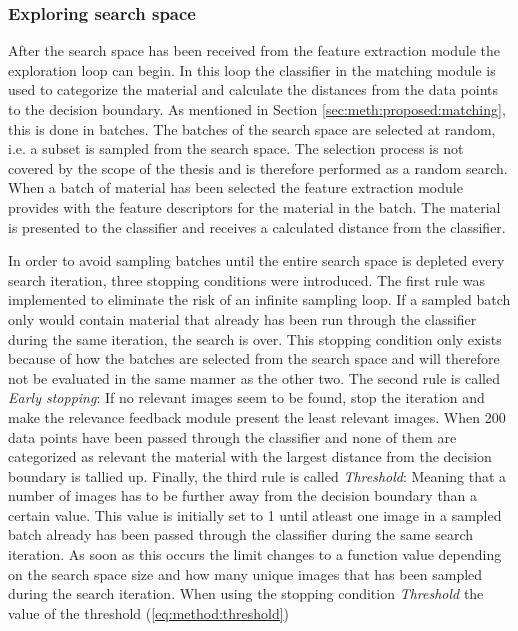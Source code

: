 \subsubsection{Exploring search space}
\label{sec:method:proposed:matching:search}
After the search space has been received from the feature extraction module the exploration loop can begin. In this loop the classifier in the matching module is used to categorize the material and calculate the distances from the data points to the decision boundary. As mentioned in Section \ref{sec:meth:proposed:matching}, this is done in batches. The batches of the search space are selected at random, i.e. a subset is sampled from the search space. The selection process is not covered by the scope of the thesis and is therefore performed as a random search. When a batch of material has been selected the feature extraction module provides with the feature descriptors for the material in the batch. The material is presented to the classifier and receives a calculated distance from the classifier. 

In order to avoid sampling batches until the entire search space is depleted every search iteration, three stopping conditions were introduced. The first rule was implemented to eliminate the risk of an infinite sampling loop. If a sampled batch only would contain material that already has been run through the classifier during the same iteration, the search is over. This stopping condition only exists because of how the batches are selected from the search space and will therefore not be evaluated in the same manner as the other two. The second rule is called \emph{Early stopping}: If no relevant images seem to be found, stop the iteration and make the relevance feedback module present the least relevant images. When 200 data points have been passed through the classifier and none of them are categorized as relevant the material with the largest distance from the decision boundary is tallied up. Finally, the third rule is called \emph{Threshold}: Meaning that a number of images has to be further away from the decision boundary than a certain value. This value is initially set to 1 until atleast one image in a sampled batch already has been passed through the classifier during the same search iteration. As soon as this occurs the limit changes to a function value depending on the search space size and how many unique images that has been sampled during the search iteration. When using the stopping condition \emph{Threshold} the value of the threshold (\ref{eq:method:threshold})

